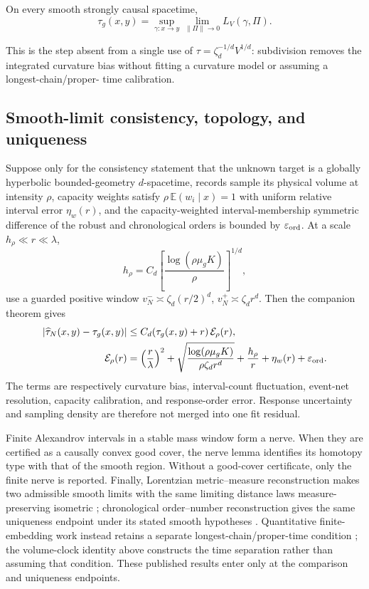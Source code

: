 \begin{theorem}
\label{thm:generic-volume-clock-identity}
On every smooth strongly causal spacetime,
\begin{equation}
 \tau_g(x,y)=
 \sup_{\gamma:x\to y}\lim_{\|\Pi\|\to0}L_V(\gamma,\Pi).
 \label{eq:generic-clock-identity}
\end{equation}
\end{theorem}

This is the step absent from a single use of
\(\tau=\zeta_d^{-1/d}V^{1/d}\): subdivision removes the integrated curvature
bias without fitting a curvature model or assuming a longest-chain/proper-
time calibration.

\subsection{Smooth-limit consistency, topology, and uniqueness}

Suppose only for the consistency statement that the unknown target is a
globally hyperbolic bounded-geometry \(d\)-spacetime, records sample its
physical volume at intensity \(\rho\), capacity weights satisfy
\(\rho\,\mathbb E(w_i\mid x)=1\) with uniform relative interval error
\(\eta_w(r)\), and the capacity-weighted interval-membership symmetric
difference of the robust and chronological orders is bounded by
\(\varepsilon_{\rm ord}\).  At a scale
\(h_\rho\ll r\ll\lambda\),
\[
 h_\rho=C_d\left[\frac{\log(\rho\mu_gK)}{\rho}\right]^{1/d},
\]
use a guarded positive window
\(v_N^-\asymp\zeta_d(r/2)^d\),
\(v_N^+\asymp\zeta_dr^d\).  Then
the companion theorem gives
\begin{align}
 |\widehat\tau_N(x,y)-\tau_g(x,y)|
 &\le C_d(\tau_g(x,y)+r)\,\mathcal E_\rho(r),\label{eq:updated-lor-error}\\
 \mathcal E_\rho(r)
 &=\left(\frac r\lambda\right)^2
 +\sqrt{\frac{\log(\rho\mu_gK)}{\rho\zeta_dr^d}}
 +\frac{h_\rho}{r}+\eta_w(r)+\varepsilon_{\rm ord}.
 \label{eq:generic-error-budget}
\end{align}
The terms are respectively curvature bias, interval-count fluctuation,
event-net resolution, capacity calibration, and response-order error.
Response uncertainty and sampling density are therefore not merged into one
fit residual.

Finite Alexandrov intervals in a stable mass window form a nerve.  When they
are certified as a causally convex good cover, the nerve lemma identifies its
homotopy type with that of the smooth region.  Without a good-cover
certificate, only the finite nerve is reported.  Finally, Lorentzian
metric--measure reconstruction makes two admissible smooth limits with the
same limiting distance laws measure-preserving isometric
\cite{BraunSaemann2025}; chronological order--number reconstruction gives the
same uniqueness endpoint under its stated smooth hypotheses
\cite{BraunOrderNumber2026}.  Quantitative finite-embedding work instead
retains a separate longest-chain/proper-time condition
\cite{MadsenCausalEmbedding2026}; the volume-clock identity above constructs
the time separation rather than assuming that condition.  These published
results enter only at the comparison and uniqueness endpoints.

